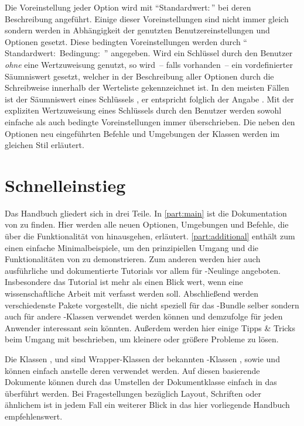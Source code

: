 Die Voreinstellung jeder Option wird mit \enquote{Standardwert:\,} 
bei deren Beschreibung angeführt. Einige dieser Voreinstellungen sind nicht 
immer gleich sondern werden in Abhängigkeit der genutzten Benutzereinstellungen 
und Optionen gesetzt. Diese bedingten Voreinstellungen werden durch 
\enquote{%
  Standardwert:\,%
  \PValue{\,|\,}Bedingung:\,%
}
angegeben. Wird ein Schlüssel durch den Benutzer \emph{ohne} eine Wertzuweisung 
genutzt, so wird~-- falls vorhanden~-- ein vordefinierter Säumniswert gesetzt, 
welcher in der Beschreibung aller Optionen durch die~ 
Schreibweise innerhalb der Werteliste gekennzeichnet ist. In den meisten Fällen 
ist der Säumniswert eines Schlüssels , er entspricht folglich der 
Angabe . Mit der expliziten Wertzuweisung eines 
Schlüssels durch den Benutzer werden sowohl einfache als auch bedingte 
Voreinstellungen immer überschrieben. Die neben den Optionen neu eingeführten 
Befehle und Umgebungen der Klassen werden im gleichen Stil erläutert.



\section{Schnelleinstieg}

Das Handbuch gliedert sich in drei Teile. In \autoref{part:main} ist die 
Dokumentation von \TUDScript zu finden. Hier werden alle neuen Optionen, 
Umgebungen und Befehle, die über die Funktionalität von \KOMAScript{} 
hinausgehen, erläutert. \autoref{part:additional} enthält zum einen einfache 
Minimalbeispiele, um den prinzipiellen Umgang und die Funktionalitäten von 
\TUDScript zu demonstrieren. Zum anderen werden hier auch ausführliche und 
dokumentierte Tutorials vor allem für -Neulinge angeboten. 
Insbesondere das Tutorial  ist mehr als einen Blick wert, 
wenn eine wissenschaftliche Arbeit mit  verfasst werden soll.
Abschließend werden verschiedenste Pakete vorgestellt, die nicht speziell für 
das \TUDScript-Bundle selber sondern auch für andere -Klassen
verwendet werden können und demzufolge für jeden Anwender interessant sein 
könnten. Außerdem werden hier einige Tipps \& Tricks beim Umgang mit 
 beschrieben, um kleinere oder größere Probleme zu lösen.

Die Klassen ,  und  
sind Wrapper-Klassen der bekannten \KOMAScript-Klassen , 
 sowie  und können einfach anstelle deren 
verwendet werden. Auf diesen basierende Dokumente können durch das Umstellen 
der Dokumentklasse einfach in das \TUDCD überführt werden. Bei Fragestellungen 
bezüglich Layout, Schriften oder ähnlichem ist in jedem Fall ein weiterer Blick
in das hier vorliegende Handbuch empfehlenswert.



